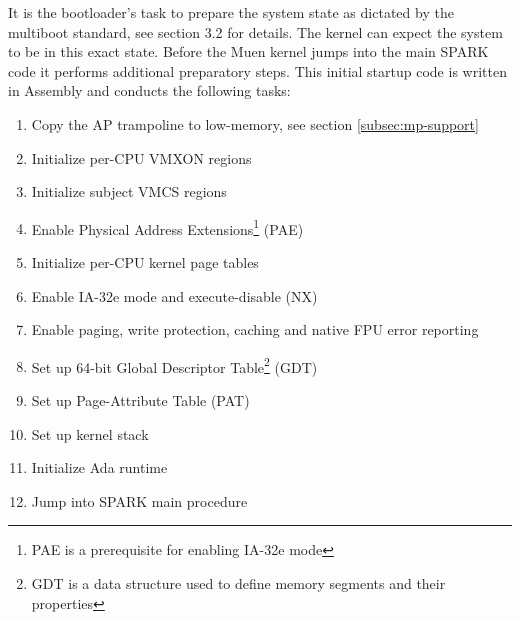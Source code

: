 It is the bootloader's task to prepare the system state as dictated by the
multiboot standard, see \cite{multiboot} section 3.2 for details. The kernel
can expect the system to be in this exact state. Before the Muen kernel jumps
into the main SPARK code it performs additional preparatory steps. This initial
startup code is written in Assembly and conducts the following tasks:

\begin{enumerate}
	\item Copy the AP trampoline to low-memory, see section
		\ref{subsec:mp-support} \item Initialize per-CPU VMXON regions
	\item Initialize subject VMCS regions
	\item Enable Physical Address Extensions\footnote{PAE is a prerequisite for enabling IA-32e mode} (PAE)
	\item Initialize per-CPU kernel page tables
	\item Enable IA-32e mode and execute-disable (NX)
	\item Enable paging, write protection, caching and native FPU error
		reporting
	\item Set up 64-bit Global Descriptor Table\footnote{GDT is a data structure used to define memory segments and their properties} (GDT)
	\item Set up Page-Attribute Table (PAT)
	\item Set up kernel stack
	\item Initialize Ada runtime
	\item Jump into SPARK main procedure
\end{enumerate}
